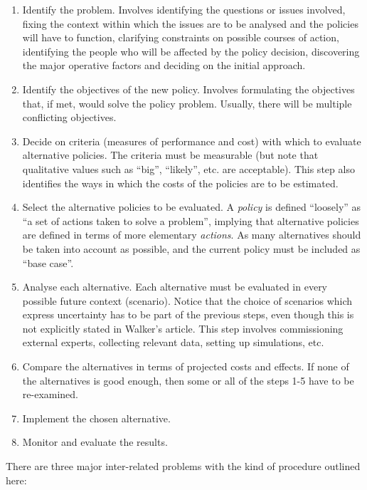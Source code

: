 \documentclass[]{article}
\begin{document}
\begin{enumerate}
\def\labelenumi{\arabic{enumi}.}
\item
  Identify the problem. Involves identifying the questions or issues
  involved, fixing the context within which the issues are to be
  analysed and the policies will have to function, clarifying
  constraints on possible courses of action, identifying the people who
  will be affected by the policy decision, discovering the major
  operative factors and deciding on the initial approach.
\item
  Identify the objectives of the new policy. Involves formulating the
  objectives that, if met, would solve the policy problem. Usually,
  there will be multiple conflicting objectives.
\item
  Decide on criteria (measures of performance and cost) with which to
  evaluate alternative policies. The criteria must be measurable (but
  note that qualitative values such as ``big'', ``likely'', etc. are
  acceptable). This step also identifies the ways in which the costs of
  the policies are to be estimated.
\item
  Select the alternative policies to be evaluated. A \emph{policy} is
  defined ``loosely'' as ``a set of actions taken to solve a problem'',
  implying that alternative policies are defined in terms of more
  elementary \emph{actions}. As many alternatives should be taken into
  account as possible, and the current policy must be included as ``base
  case''.
\item
  Analyse each alternative. Each alternative must be evaluated in every
  possible future context (scenario). Notice that the choice of
  scenarios which express uncertainty has to be part of the previous
  steps, even though this is not explicitly stated in Walker's article.
  This step involves commissioning external experts, collecting relevant
  data, setting up simulations, etc.
\item
  Compare the alternatives in terms of projected costs and effects. If
  none of the alternatives is good enough, then some or all of the steps
  1-5 have to be re-examined.
\item
  Implement the chosen alternative.
\item
  Monitor and evaluate the results.
\end{enumerate}

There are three major inter-related problems with the kind of procedure
outlined here:
\end{document}
